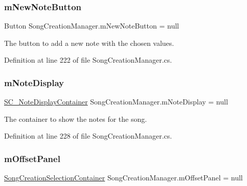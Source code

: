 \subsubsection{\texorpdfstring{m\+New\+Note\+Button}{mNewNoteButton}}
{\footnotesize\ttfamily Button Song\+Creation\+Manager.\+m\+New\+Note\+Button = null\hspace{0.3cm}{\ttfamily [private]}}



The button to add a new note with the chosen values. 



Definition at line 222 of file Song\+Creation\+Manager.\+cs.

\mbox{\label{group___s_c_m_priv_var_ga308f19d1b2020fc625c12dd08ee16b1c}} 
\subsubsection{\texorpdfstring{m\+Note\+Display}{mNoteDisplay}}
{\footnotesize\ttfamily \hyperlink{class_s_c___note_display_container}{S\+C\+\_\+\+Note\+Display\+Container} Song\+Creation\+Manager.\+m\+Note\+Display = null\hspace{0.3cm}{\ttfamily [private]}}



The container to show the notes for the song. 



Definition at line 228 of file Song\+Creation\+Manager.\+cs.

\mbox{\label{group___s_c_m_priv_var_ga86a44007a4b127d7aa61f75dd34a3409}} 
\subsubsection{\texorpdfstring{m\+Offset\+Panel}{mOffsetPanel}}
{\footnotesize\ttfamily \hyperlink{group___s_c_m_nest_class_class_song_creation_manager_1_1_song_creation_selection_container}{Song\+Creation\+Selection\+Container} Song\+Creation\+Manager.\+m\+Offset\+Panel = null\hspace{0.3cm}{\ttfamily [private]}}




